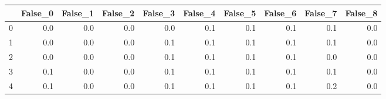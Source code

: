\begin{tabular}{lrrrrrrrrr}
\toprule
{} &  False\_0 &  False\_1 &  False\_2 &  False\_3 &  False\_4 &  False\_5 &  False\_6 &  False\_7 &  False\_8 \\ \hline
\midrule
0 &      0.0 &      0.0 &      0.0 &      0.0 &      0.1 &      0.1 &      0.1 &      0.1 &      0.0 \\ \hline
1 &      0.0 &      0.0 &      0.0 &      0.1 &      0.1 &      0.1 &      0.1 &      0.1 &      0.0 \\ \hline
2 &      0.0 &      0.0 &      0.0 &      0.1 &      0.1 &      0.1 &      0.1 &      0.0 &      0.0 \\ \hline
3 &      0.1 &      0.0 &      0.0 &      0.1 &      0.1 &      0.1 &      0.1 &      0.1 &      0.0 \\ \hline
4 &      0.1 &      0.0 &      0.0 &      0.1 &      0.1 &      0.1 &      0.1 &      0.2 &      0.0 \\ \hline
\bottomrule
\end{tabular}
